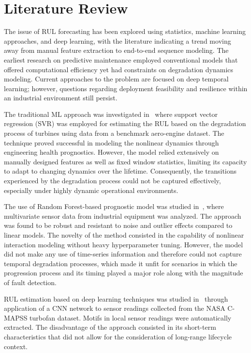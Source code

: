 \documentclass[conference]{IEEEtran}
\begin{document}
\section{Literature Review}

The issue of RUL forecasting has been explored using statistics, machine learning approaches, and deep learning, with the literature indicating a trend moving away from manual feature extraction to end-to-end sequence modeling. The earliest research on predictive maintenance employed conventional models that offered computational efficiency yet had constraints on degradation dynamics modeling. Current approaches to the problem are focused on deep temporal learning; however, questions regarding deployment feasibility and resilience within an industrial environment still persist.

The traditional ML approach was investigated in~\cite{ref1} where support vector regression (SVR) was employed for estimating the RUL based on the degradation process of turbines using data from a benchmark aero-engine dataset. The technique proved successful in modeling the nonlinear dynamics through engineering health prognostics. However, the model relied extensively on manually designed features as well as fixed window statistics, limiting its capacity to adapt to changing dynamics over the lifetime. Consequently, the transitions experienced by the degradation process could not be captured effectively, especially under highly dynamic operational environments.

The use of Random Forest-based prognostic model was studied in~\cite{ref2}, where multivariate sensor data from industrial equipment was analyzed. The approach was found to be robust and resistant to noise and outlier effects compared to linear models. The novelty of the method consisted in the capability of nonlinear interaction modeling without heavy hyperparameter tuning. However, the model did not make any use of time-series information and therefore could not capture temporal degradation processes, which made it unfit for scenarios in which the progression process and its timing played a major role along with the magnitude of fault detection.

RUL estimation based on deep learning techniques was studied in~\cite{ref3} through application of a CNN network to sensor readings collected from the NASA C-MAPSS turbofan dataset. Motifs in local sensor readings were automatically extracted. The disadvantage of the approach consisted in its short-term characteristics that did not allow for the consideration of long-range lifecycle context.
\end{document}
